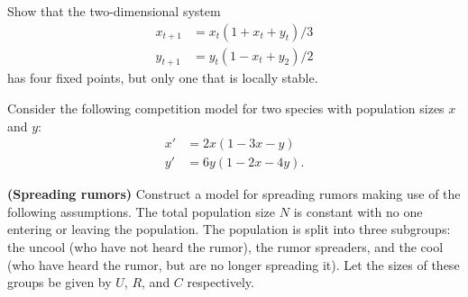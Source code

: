 \documentclass[12pt]{exam}
\begin{document}
\begin{questions}

\question[10]
Show that the two-dimensional system
\begin{align*}
x_{t+1} &= x_t(1+x_t+y_t)/3 \\
y_{t+1} &= y_t(1-x_t+y_2)/2
\end{align*}
has four fixed points, but only one that is locally stable.

\question[20]
Consider the following competition model for two species with population sizes $x$ and $y$:
\begin{equation}\label{sys:compet}
\begin{aligned}
x' &= 2x(1-3x-y) \\
y' &= 6y(1-2x-4y).
\end{aligned}
\end{equation}


\question[30] \textbf{(Spreading rumors)}
Construct a model for spreading rumors making use of the following assumptions.  The total population size $N$ is
constant with no one entering or leaving the population.  The population
is split into three subgroups: the uncool (who have not heard the rumor),
the rumor spreaders, and the cool (who have heard the rumor, but are no
longer spreading it).  Let the sizes of these groups be given by $U$,
$R$, and $C$ respectively.


\end{questions}
\end{document}

